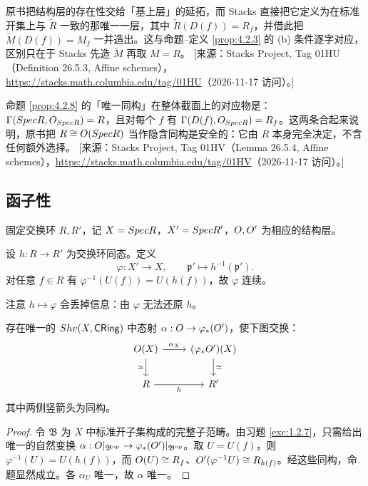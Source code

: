\begin{yizhu}
原书把结构层的存在性交给「基上层」的延拓，而 Stacks 直接把它定义为在标准开集上与 $\widetilde R$ 一致的那唯一一层，其中 $\widetilde R(D(f))=R_f$，并借此把 $\widetilde M(D(f))=M_f$ 一并造出。这与命题--定义 \ref{prop:4.2.3} 的 (b) 条件逐字对应，区别只在于 Stacks 先造 $\widetilde M$ 再取 $M=R$。
[来源：Stacks Project, Tag 01HU（Definition 26.5.3, Affine schemes），\url{https://stacks.math.columbia.edu/tag/01HU}（2026-11-17 访问）。]
\end{yizhu}

\begin{yizhu}
命题 \ref{prop:4.2.8} 的「唯一同构」在整体截面上的对应物是：$\Gamma(Spec R,O_{Spec R})=R$，且对每个 $f$ 有 $\Gamma(D(f),O_{Spec R})=R_f$。这两条合起来说明，原书把 $R\cong O(Spec R)$ 当作隐含同构是安全的：它由 $R$ 本身完全决定，不含任何额外选择。
[来源：Stacks Project, Tag 01HV（Lemma 26.5.4, Affine schemes），\url{https://stacks.math.columbia.edu/tag/01HV}（2026-11-17 访问）。]
\end{yizhu}

\subsection{函子性}\label{sec:4.3}

固定交换环 $R,R'$，记 $X = Spec R$，$X' = Spec R'$，$O,O'$ 为相应的结构层。

\begin{construction}\label{con:4.3.1}
设 $h : R \to R'$ 为交换环同态。定义
\[
\varphi : X' \to X,\qquad \mathfrak p' \mapsto h^{-1}(\mathfrak p').
\]
对任意 $f \in R$ 有 $\varphi^{-1}(U(f)) = U(h(f))$，故 $\varphi$ 连续。
\end{construction}

注意 $h \mapsto \varphi$ 会丢掉信息：由 $\varphi$ 无法还原 $h$。

\begin{proposition}\label{prop:4.3.2}
存在唯一的 $Shv(X,\mathsf{CRing})$ 中态射 $\alpha : O \to \varphi_*(O')$，使下图交换：
\[
\begin{tikzcd}
\cO(X) \arrow[r,"\alpha_X"] \arrow[d,"\simeq"'] & (\varphi_*\cO')(X) \arrow[d,"\simeq"] \\
R \arrow[r,"h"'] & R'
\end{tikzcd}
\]
其中两侧竖箭头为同构。
\end{proposition}

\begin{proof}
令 $\mathfrak{B}$ 为 $X$ 中标准开子集构成的完整子范畴。由习题 \ref{exc:1.2.7}，只需给出唯一的自然变换 $\alpha : O|_{\mathfrak{B}^{\mathrm{op}}} \to \varphi_*(O')|_{\mathfrak{B}^{\mathrm{op}}}$。取 $U = U(f)$，则 $\varphi^{-1}(U) = U(h(f))$，而 $O(U) \cong R_f$、$O'(\varphi^{-1}U) \cong R_{h(f)}$。经这些同构，命题显然成立。各 $\alpha_U$ 唯一，故 $\alpha$ 唯一。
\end{proof}

